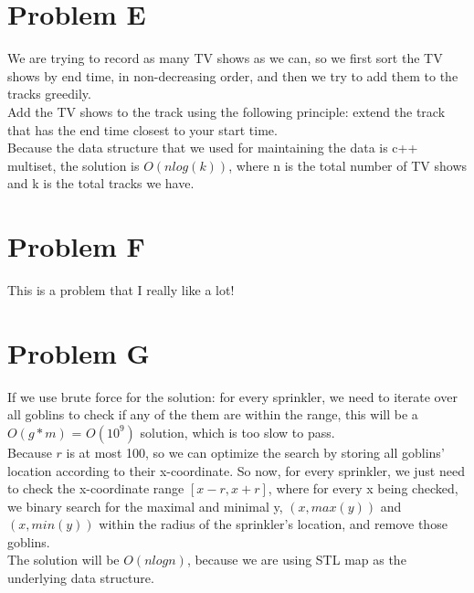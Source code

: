 \documentclass[10pt]{article}
\begin{document}
\newpage



\section*{Problem E}

We are trying to record as many TV shows as we can, so we first sort the TV shows by end time, in non-decreasing order, and then we try to add them to the tracks greedily.\\

Add the TV shows to the track using the following principle: extend the track that has the end time closest to your start time. \\

Because the data structure that we used for maintaining the data is c++ multiset, the solution is $O(nlog(k))$, where n is the total number of TV shows and k is the total tracks we have. \\



\newpage



\section*{Problem F}

This is a problem that I really like a lot!





\newpage



\section*{Problem G}

If we use brute force for the solution: for every sprinkler, we need to iterate over all goblins to check if any of the them are within the range, this will be a $O(g * m)$ = $O(10^9)$ solution, which is too slow to pass. \\

Because $r$ is at most 100, so we can optimize the search by storing all goblins' location according to their x-coordinate. So now, for every sprinkler, we just need to check the x-coordinate range $[x - r, x + r]$, where for every x being checked, we binary search for the maximal and minimal y, $(x, max(y))$ and $(x, min(y))$ within the radius of the sprinkler's location, and remove those goblins.\\

The solution will be $O(nlogn)$, because we are using STL map as the underlying data structure. \\



\newpage
\end{document}
